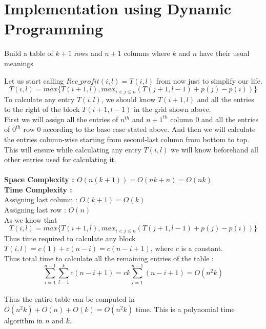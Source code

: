 \documentclass{article}
\begin{document}
\section{Implementation using Dynamic Programming}
Build a table of $k+1$ rows and $n+1$ columns where $k$ and $n$ have their usual meanings\\
Let us start calling $Rec\_profit(i,l)=T(i,l)$ from now just to simplify our life.\\
$$T(i,l)=max\{T(i+1,l),max_{i<j\leq n}(T(j+1,l-1)+p(j)-p(i))\}$$
To calculate any entry $T(i,l)$, we should know $T(i+1,l)$ and all the entries to the right of the block $T(i+1,l-1)$ in the grid shown above.\\
First we will assign all the entries of $n^{th}$ and $n+1^{th}$ column $0$ and all the entries of $0^{th}$ row $0$ according to the base case stated above. And then we will calculate the entries column-wise starting from second-last column from bottom to top. This will ensure while calculating any entry $T(i,l)$ we will know beforehand all other entries used for calculating it.\\\\
\textbf{Space Complexity : $O(n(k+1))=O(nk+n)=O(nk)$}\\
\textbf{Time Complexity :}\\
Assigning last column : $O(k+1)=O(k)$\\
Assigning last row : $O(n)$\\As we know that
$$T(i,l)=max\{T(i+1,l),max_{i<j\leq n}(T(j+1,l-1)+p(j)-p(i))\}$$
Thus time required to calculate any block $T(i,l) = c(1)+c(n-i)=c(n-i+1)$, where $c$ is a constant.\\Thus total time to calculate all the remaining entries of the table : $$\sum_{i=1}^{n-1} \sum_{l=1}^{k} c(n-i+1)=ck\sum_{i=1}^{n-1} (n-i+1)=O(n^2k)$$\\
Thus the entire table can be computed in $O(n^2k)+O(n)+O(k)=O(n^2k)$ time. This is a polynomial time algorithm in $n$ and $k$.\\
\end{document}
